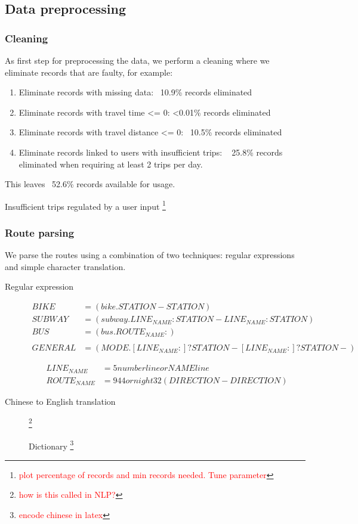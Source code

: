 \documentclass{article}
\newcommand{\selfnote}[1]{\footnote{\textcolor{red}{#1}}}
\begin{document}
\subsection{Data preprocessing}
\subsubsection{Cleaning}
As first step for preprocessing the data, we perform a cleaning where we eliminate records that are faulty, for example: 

\begin{enumerate}
\item Eliminate records with missing data: ~10.9\% records eliminated
\item Eliminate records with travel time <= 0: <0.01\% records eliminated
\item Eliminate records with travel distance <= 0: ~10.5\% records eliminated
\item Eliminate records linked to users with insufficient trips: ~ 25.8\% records eliminated when requiring at least 2 trips per day.
\end{enumerate}

This leaves ~52.6\% records available for usage. 

Insufficient trips regulated by a user input \selfnote{plot percentage of records and min records needed. Tune parameter}

\subsubsection{Route parsing} 
We parse the routes using a combination of two techniques: regular expressions and simple character translation. 

\begin{description}
\item [Regular expression]
    \begin{align*}
    BIKE &= (bike.STATION-STATION) \\
    SUBWAY &= (subway.LINE_{NAME}:STATION-LINE_{NAME}:STATION) \\
    BUS &= (bus.ROUTE_{NAME}:) \\ \\
    GENERAL &= (MODE.[LINE_{NAME}:]? STATION-[LINE_{NAME}:]? STATION-) 
	\end{align*}    
    
    \begin{align*}
    LINE_{NAME} &=      5 number line or NAME line \\
    ROUTE_{NAME} &=      944 or night 32 (DIRECTION - DIRECTION)
    \end{align*}

\item [Chinese to English translation]
\selfnote{how is this called in NLP?}

Dictionary \selfnote{encode chinese in latex}

\end{description}
\end{document}
